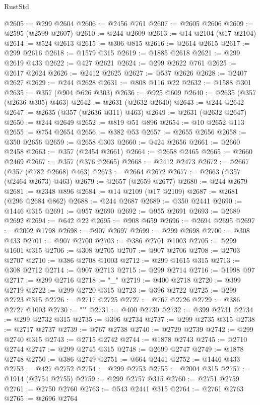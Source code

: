 \begin{lexlean}{RustStd}
\begin{coremodule}
@2605 := @299 @2604
@2606 := @2456 @761
@2607 := @2605 @2606
@2609 := @2595 (@2599 @2607)
@2610 := @244 @2609
@2613 := @14 @2104 (@17 @2104)
@2614 := @524 @2613
@2615 := @306 @815
@2616 := @2614 @2615
@2617 := @299 @2616
@2618 := @1579 @315
@2619 := @1885 @2618
@2621 := @299 @2619 @433
@2622 := @427 @2621
@2624 := @299 @2622 @761
@2625 := @2617 @2624
@2626 := @2412 @2625
@2627 := @537 @2626
@2628 := @2407 @2627
@2629 := @244 @2628
@2631 := @808 @116 @22
@2632 := @1588 @301
@2635 := @357 (@904 @626 @303)
@2636 := @925 @609
@2640 := @2635 (@357 (@2636 @305) @463)
@2642 := @2631 (@2632 @2640)
@2643 := @244 @2642
@2647 := @2635 (@357 (@2636 @311) @463)
@2649 := @2631 (@2632 @2647)
@2650 := @244 @2649
@2652 := @819 @51 @896
@2654 := @10 @2652 @113
@2655 := @754 @2654
@2656 := @382 @53
@2657 := @2655 @2656
@2658 := @350 @2656
@2659 := @2658 @303
@2660 := @424 @2656
@2661 := @2660 @2458
@2663 := @357 (@2454 @2661)
@2664 := @2658 @2465
@2665 := @2660 @2469
@2667 := @357 (@376 @2665)
@2668 := @2412 @2473
@2672 := @2667 (@357 (@782 @2668) @463)
@2673 := @2664 @2672
@2677 := @2663 (@357 (@2464 @2673) @463)
@2679 := @2657 (@2659 @2677)
@2680 := @244 @2679
@2681 := @2348 @896
@2684 := @14 @2109 (@17 @2109)
@2687 := @2681 (@296 @2684 @862)
@2688 := @244 @2687
@2689 := @350 @2441
@2690 := @1446 @315
@2691 := @957 @2690
@2692 := @955 @2691
@2693 := @2689 @2692
@2694 := @642 @22
@2695 := @908 @659
@2696 := @2694 @2695
@2697 := @2002 @1798
@2698 := @907 @2697
@2699 := @299 @2698
@2700 := @308 @433
@2701 := @907 @2700
@2703 := @386 @2701 @1003
@2705 := @299 @1601 @315
@2706 := @308 @2705
@2707 := @907 @2706
@2708 := @2703 @2707
@2710 := @386 @2708 @1003
@2712 := @299 @1615 @315
@2713 := @308 @2712
@2714 := @907 @2713
@2715 := @299 @2714
@2716 := @1998 @97
@2717 := @299 @2716
@2718 := "_"
@2719 := @400 @2718
@2720 := @399 @2719
@2722 := @299 @2720 @315
@2723 := @396 @2722
@2725 := @299 @2723 @315
@2726 := @2717 @2725
@2727 := @767 @2726
@2729 := @386 @2727 @1003
@2730 := "'"
@2731 := @400 @2730
@2732 := @399 @2731
@2734 := @299 @2732 @315
@2735 := @396 @2734
@2737 := @299 @2735 @315
@2738 := @2717 @2737
@2739 := @767 @2738
@2740 := @2729 @2739
@2742 := @299 @2740 @315
@2743 := @2715 @2742
@2744 := @1878 @2743
@2745 := @2710 @2744
@2747 := @299 @2745 @315
@2748 := @2699 @2747
@2749 := @1878 @2748
@2750 := @386 @2749
@2751 := @664 @2441
@2752 := @1446 @433
@2753 := @427 @2752
@2754 := @299 @2753
@2755 := @2004 @315
@2757 := @1914 (@2754 @2755)
@2759 := @299 @2757 @315
@2760 := @2751 @2759
@2761 := @2750 @2760
@2763 := @543 @2441 @315
@2764 := @2761 @2763
@2765 := @2696 @2764

\end{coremodule}
\end{lexlean}
